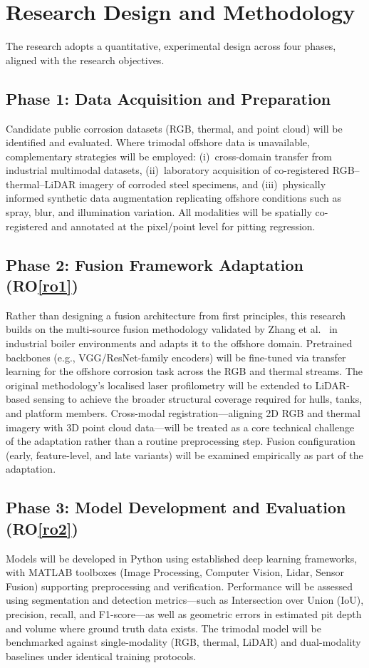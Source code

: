 \documentclass[conference]{IEEEtran}
\begin{document}
\section{Research Design and Methodology}

The research adopts a quantitative, experimental design across four phases, aligned with the research objectives.

\subsection{Phase 1: Data Acquisition and Preparation}
Candidate public corrosion datasets (RGB, thermal, and point cloud) will be identified and evaluated. Where trimodal offshore data is unavailable, complementary strategies will be employed: (i)~cross-domain transfer from industrial multimodal datasets, (ii)~laboratory acquisition of co-registered RGB--thermal--LiDAR imagery of corroded steel specimens, and (iii)~physically informed synthetic data augmentation replicating offshore conditions such as spray, blur, and illumination variation. All modalities will be spatially co-registered and annotated at the pixel/point level for pitting regression.

\subsection{Phase 2: Fusion Framework Adaptation (RO\ref{ro1})}
Rather than designing a fusion architecture from first principles, this research builds on the multi-source fusion methodology validated by Zhang et al.\ \cite{zhang2026application} in industrial boiler environments and adapts it to the offshore domain. Pretrained backbones (e.g., VGG/ResNet-family encoders) will be fine-tuned via transfer learning for the offshore corrosion task across the RGB and thermal streams. The original methodology’s localised laser profilometry will be extended to LiDAR-based sensing to achieve the broader structural coverage required for hulls, tanks, and platform members. Cross-modal registration—aligning 2D RGB and thermal imagery with 3D point cloud data—will be treated as a core technical challenge of the adaptation rather than a routine preprocessing step. Fusion configuration (early, feature-level, and late variants) will be examined empirically as part of the adaptation.

\subsection{Phase 3: Model Development and Evaluation (RO\ref{ro2})}
Models will be developed in Python using established deep learning frameworks, with MATLAB toolboxes (Image Processing, Computer Vision, Lidar, Sensor Fusion) supporting preprocessing and verification. Performance will be assessed using segmentation and detection metrics—such as Intersection over Union (IoU), precision, recall, and F1-score—as well as geometric errors in estimated pit depth and volume where ground truth data exists. The trimodal model will be benchmarked against single-modality (RGB, thermal, LiDAR) and dual-modality baselines under identical training protocols.
\end{document}
